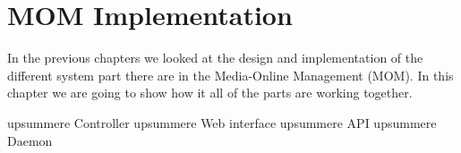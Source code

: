 \chapter{MOM Implementation}

In the previous chapters we looked at the design and implementation of the different system part there are in the Media-Online Management (MOM).
In this chapter we are going to show how it all of the parts are working together.





upsummere Controller 
upsummere Web interface
upsummere API
upsummere Daemon